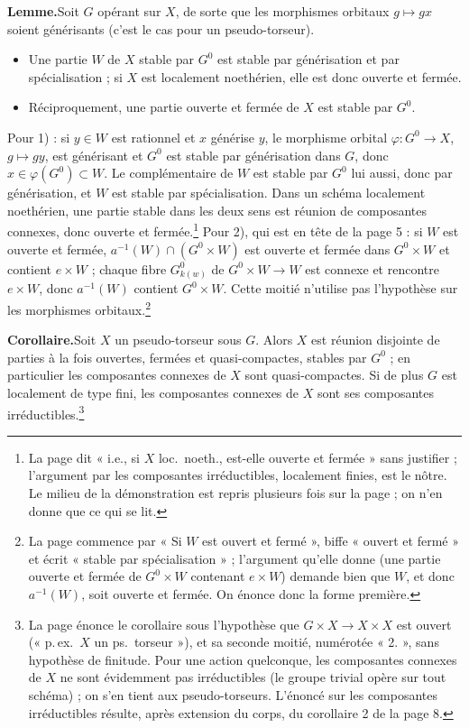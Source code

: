 \documentclass[11pt,a4paper]{article}
\begin{document}
\textbf{Lemme.}\quad Soit $G$ opérant sur $X$, de sorte que les morphismes orbitaux
$g \mapsto g x$ soient générisants (c'est le cas pour un pseudo-torseur).
\begin{itemize}
\item[1)] Une partie $W$ de $X$ stable par $G^{0}$ est stable par
générisation et par spécialisation ; si $X$ est localement noethérien, elle
est donc ouverte et fermée.
\item[2)] Réciproquement, une partie ouverte et fermée de $X$ est stable par
$G^{0}$.
\end{itemize}

Pour 1) : si $y \in W$ est rationnel et $x$ générise $y$, le morphisme
orbital $\varphi \colon G^{0} \to X$, $g \mapsto g y$, est générisant et
$G^{0}$ est stable par générisation dans $G$, donc $x \in \varphi(G^{0})
\subset W$. Le complémentaire de $W$ est stable par $G^{0}$ lui aussi, donc
par générisation, et $W$ est stable par spécialisation. Dans un schéma
localement noethérien, une partie stable dans les deux sens est réunion de
composantes connexes, donc ouverte et fermée.\footnote{La page dit « i.e., si
$X$ loc.\ noeth., est-elle ouverte et fermée » sans justifier ; l'argument
par les composantes irréductibles, localement finies, est le nôtre. Le milieu
de la démonstration est repris plusieurs fois sur la page ; on n'en donne que
ce qui se lit.}
Pour 2), qui est en tête de la page 5 : si $W$ est ouverte et fermée,
$a^{-1}(W) \cap (G^{0} \times W)$ est ouverte et fermée dans
$G^{0} \times W$ et contient $e \times W$ ; chaque fibre
$G^{0}_{k(w)}$ de $G^{0} \times W \to W$ est connexe et rencontre
$e \times W$, donc $a^{-1}(W)$ contient $G^{0} \times W$. Cette moitié
n'utilise pas l'hypothèse sur les morphismes orbitaux.\footnote{La page
commence par « Si $W$ est ouvert et fermé », biffe « ouvert et fermé » et
écrit « stable par spécialisation » ; l'argument qu'elle donne (une partie
ouverte et fermée de $G^{0} \times W$ contenant $e \times W$) demande bien
que $W$, et donc $a^{-1}(W)$, soit ouverte et fermée. On énonce donc la forme
première.}

\textbf{Corollaire.}\quad Soit $X$ un pseudo-torseur sous $G$. Alors $X$ est réunion disjointe de
parties à la fois ouvertes, fermées et quasi-compactes, stables par $G^{0}$ ;
en particulier les composantes connexes de $X$ sont quasi-compactes. Si de
plus $G$ est localement de type fini, les composantes connexes de $X$ sont
ses composantes irréductibles.\footnote{La page énonce le corollaire sous
l'hypothèse que $G \times X \to X \times X$ est ouvert (« p.\,ex.\ $X$ un
ps.\ torseur »), et sa seconde moitié, numérotée « 2. », sans hypothèse de
finitude. Pour une action quelconque, les composantes connexes de $X$ ne sont
évidemment pas irréductibles (le groupe trivial opère sur tout schéma) ; on
s'en tient aux pseudo-torseurs. L'énoncé sur les composantes irréductibles
résulte, après extension du corps, du corollaire 2 de la page 8.}
\end{document}
